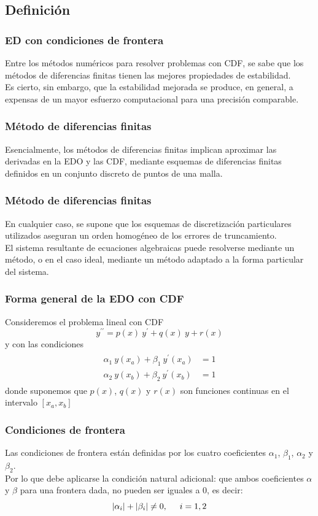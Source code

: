 \subsection{Definición}
\begin{frame}
\frametitle{ED con condiciones de frontera}
Entre los métodos numéricos para resolver problemas con CDF, se sabe que los métodos de diferencias finitas tienen las mejores propiedades de estabilidad.
\\
\bigskip
Es cierto, sin embargo, que la estabilidad mejorada se produce, en general, a expensas de un mayor esfuerzo computacional para una precisión comparable.
\end{frame}
\begin{frame}
\frametitle{Método de diferencias finitas}
Esencialmente, los métodos de diferencias finitas implican aproximar las derivadas en la EDO y las CDF, mediante esquemas de diferencias finitas definidos en un conjunto discreto de puntos de una malla.
\end{frame}
\begin{frame}
\frametitle{Método de diferencias finitas}
En cualquier caso, se supone que los esquemas de discretización particulares utilizados aseguran un orden homogéneo de los errores de truncamiento.
\\
\bigskip
El sistema resultante de ecuaciones algebraicas puede resolverse mediante un método, o en el caso ideal, mediante un método adaptado a la forma particular del sistema.
\end{frame}
\begin{frame}
\frametitle{Forma general de la EDO con CDF}
Consideremos el problema lineal con CDF
\begin{equation}
y^{\prime \prime} =  p(x) \: y^{\prime} +  q(x) \: y + r(x)
\label{eq:ecuacion_12_93} 
\end{equation}
y con las condiciones
\begin{align}
\begin{aligned}
\alpha_{1} \: y(x_{a}) + \beta_{1} \: y^{\prime}(x_{a}) &= 1 \\
\alpha_{2} \: y(x_{b}) + \beta_{2} \: y^{\prime}(x_{b}) &= 1
\end{aligned}
\label{eq:ecuacion_12_94}
\end{align}
donde suponemos que $p(x)$, $q(x)$ y $r(x)$ son funciones continuas en el intervalo $[x_{a}, x_{b}]$
\end{frame}
\begin{frame}
\frametitle{Condiciones de frontera}
Las condiciones de frontera están definidas por los cuatro coeficientes $\alpha_{1}$, $\beta_{1}$, $\alpha_{2}$ y $\beta_{2}$.
\\
\bigskip
Por lo que debe aplicarse la condición natural adicional: que ambos coeficientes $\alpha$ y $\beta$ para una frontera dada, no pueden ser iguales a 0, es decir:
\[ \vert \alpha_{i} \vert + \vert \beta_{i} \vert \neq 0, \hspace{0.5cm} i = 1, 2 \]
\end{frame}
